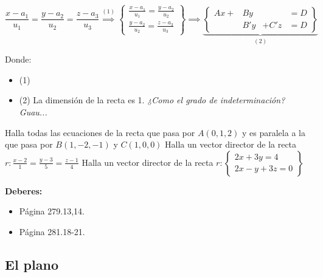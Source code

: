 \[
\frac{x-a_1}{u_1} = \frac{y-a_2}{u_2} = \frac{z-a_3}{u_3}\overset{(1)}{\implies} \left\{
\begin{array}{c}
     \displaystyle\frac{x-a_1}{u_1} = \frac{y-a_2}{u_2}\\
     \displaystyle\frac{y-a_2}{u_2} = \frac{z-a_3}{u_3}
\end{array}\right\} \implies
\underbrace{\left\{\begin{array}{cccc}
     Ax + &By    &     & = D\\
          &B'y   &+ C'z  & = D
\end{array}\right\}}_{(2)}
\]



Donde:
\begin{itemize}
    \item (1) 
    \item (2) 
    \subitem \obs {}
    \subitem \obs La dimensión de la recta es 1. \emph{¿Como el grado de indeterminación? Guau...}
\end{itemize}

\begin{problem}
    \ppart 
    Halla todas las ecuaciones de la recta que pasa por $A(0,1,2)$ y es paralela a la que pasa por $B(1,-2,-1)$ y $C(1,0,0)$
    \ppart 
    Halla un vector director de la recta $r:\displaystyle\frac{x-2}{1} = \frac{y-3}{5} = \frac{z-1}{4}$
    \ppart 
    Halla un vector director de la recta $r:\displaystyle\left\{\begin{array}{c} 2x+3y=4\\2x-y+3z=0\end{array}\right\}$
    \solution

\end{problem}

\textbf{Deberes:} 
\begin{itemize}
  \item Página 279.13,14.
  \item Página 281.18-21.
\end{itemize}

\subsection{El plano}

